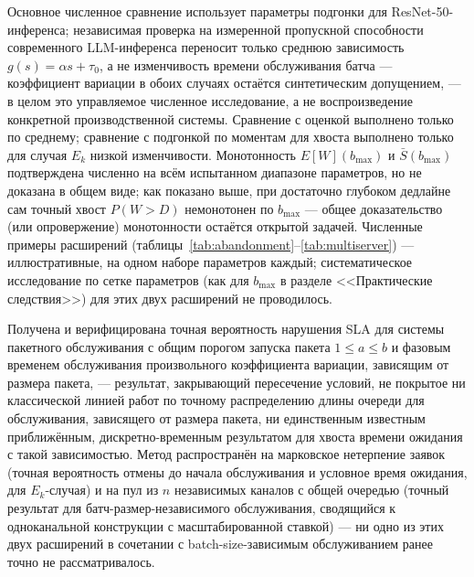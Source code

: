\documentclass[12pt,a4paper]{article}
\newcommand{\articlesection}[1]{\par\vspace{14pt}{\bfseries #1}\par\vspace{6pt}\nopagebreak}
\begin{document}
Основное численное сравнение использует параметры подгонки \cite{inoue2021} для ResNet-50-инференса; независимая проверка на измеренной пропускной способности современного LLM-инференса \cite{bench360_2026} переносит только среднюю зависимость $g(s)=\alpha s+\tau_0$, а не изменчивость времени обслуживания батча --- коэффициент вариации в обоих случаях остаётся синтетическим допущением, --- в целом это управляемое численное исследование, а не воспроизведение конкретной производственной системы. Сравнение с оценкой \cite{inoue2021} выполнено только по среднему; сравнение с подгонкой по моментам для хвоста выполнено только для случая $E_k$ низкой изменчивости. Монотонность $E[W](b_{\max})$ и $\bar S(b_{\max})$ подтверждена численно на всём испытанном диапазоне параметров, но не доказана в общем виде; как показано выше, при достаточно глубоком дедлайне сам точный хвост $P(W>D)$ немонотонен по $b_{\max}$ --- общее доказательство (или опровержение) монотонности остаётся открытой задачей. Численные примеры расширений (таблицы~\ref{tab:abandonment}--\ref{tab:multiserver}) --- иллюстративные, на одном наборе параметров каждый; систематическое исследование по сетке параметров (как для $b_{\max}$ в разделе <<Практические следствия>>) для этих двух расширений не проводилось.

\articlesection{Заключение}

Получена и верифицирована точная вероятность нарушения SLA для системы пакетного обслуживания с общим порогом запуска пакета $1\le a\le b$ и фазовым временем обслуживания произвольного коэффициента вариации, зависящим от размера пакета, --- результат, закрывающий пересечение условий, не покрытое ни классической линией работ по точному распределению длины очереди для обслуживания, зависящего от размера пакета, ни единственным известным приближённым, дискретно-временным результатом для хвоста времени ожидания с такой зависимостью. Метод распространён на марковское нетерпение заявок (точная вероятность отмены до начала обслуживания и условное время ожидания, для $E_k$-случая) и на пул из $n$ независимых каналов с общей очередью (точный результат для батч-размер-независимого обслуживания, сводящийся к одноканальной конструкции с масштабированной ставкой) --- ни одно из этих двух расширений в сочетании с batch-size-зависимым обслуживанием ранее точно не рассматривалось.
\end{document}
